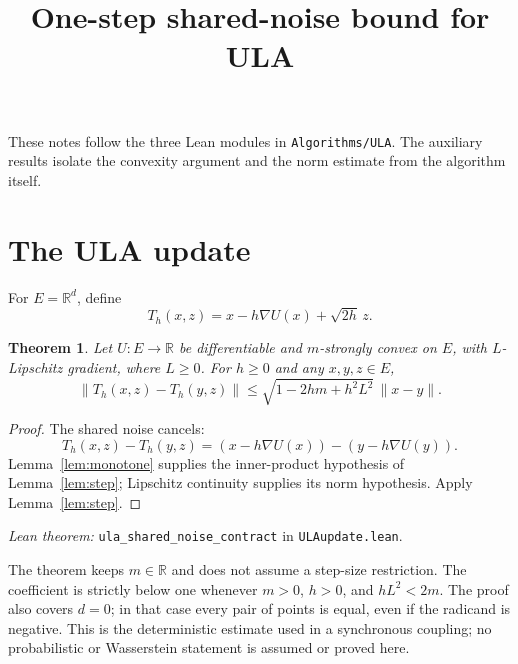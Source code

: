\documentclass[10pt,a4paper]{article}
\title{One-step shared-noise bound for ULA}
\author{}
\date{}
\newtheorem{theorem}[lemma]{Theorem}
\begin{document}
\maketitle
\vspace{-18mm}
These notes follow the three Lean modules in
\texttt{Algorithms/ULA}. The auxiliary results isolate the convexity
argument and the norm estimate from the algorithm itself.




\section{The ULA update}
For $E=\mathbb R^d$, define
\[
 T_h(x,z)=x-h\nabla U(x)+\sqrt{2h}\,z.
\]
\begin{theorem}\label{thm:ula}
Let $U:E\to\mathbb R$ be differentiable and $m$-strongly convex on
$E$, with $L$-Lipschitz gradient, where $L\ge0$. For $h\ge0$ and
any $x,y,z\in E$,
\[
 \|T_h(x,z)-T_h(y,z)\|
 \le\sqrt{1-2hm+h^2L^2}\,\|x-y\|.
\]
\end{theorem}
\begin{proof}
The shared noise cancels:
\[
 T_h(x,z)-T_h(y,z)
 =(x-h\nabla U(x))-(y-h\nabla U(y)).
\]
Lemma~\ref{lem:monotone} supplies the inner-product hypothesis of
Lemma~\ref{lem:step}; Lipschitz continuity supplies its norm
hypothesis. Apply Lemma~\ref{lem:step}.
\end{proof}
\textit{Lean theorem:} \texttt{ula\_shared\_noise\_contract}
in \texttt{ULAupdate.lean}.

The theorem keeps $m\in\mathbb R$ and does not assume a step-size
restriction. The coefficient is strictly below one whenever
$m>0$, $h>0$, and $hL^2<2m$. The proof also covers $d=0$; in that
case every pair of points is equal, even if the radicand is negative.
This is the deterministic estimate used in a synchronous coupling;
no probabilistic or Wasserstein statement is assumed or proved here.
\end{document}
